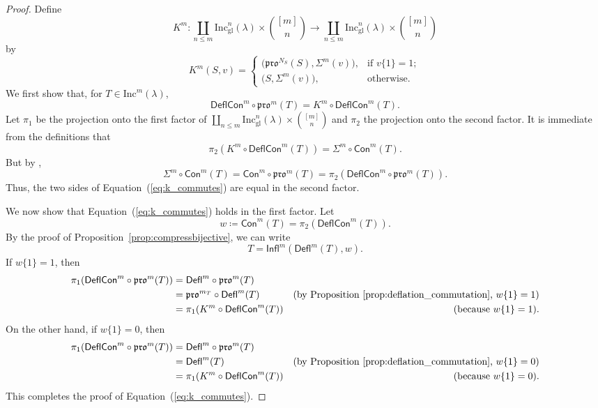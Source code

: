 \documentclass[12pt]{amsart}
\theoremstyle{definition}
\theoremstyle{remark}
\numberwithin{equation}{section}
\newcommand{\inc}{\ensuremath{\mathrm{Inc}}}
\newcommand{\incgl}{\inc_{\mathrm{gl}}}
\newcommand{\pro}{\mathfrak{pro}}
\newcommand{\deflate}{\ensuremath{\mathsf{Defl}}}
\newcommand{\tinflate}{\ensuremath{\mathsf{Infl}}}
\newcommand{\content}{\ensuremath{\mathsf{Con}}}
\newcommand{\compress}{\ensuremath{\mathsf{DeflCon}}}
\begin{document}
  \begin{proof}
Define
  \[
  K^m: \coprod_{n \leq m}\incgl^n(\lambda) \times \binom{[m]}{n} \rightarrow \coprod_{n \leq m}\incgl^n(\lambda) \times \binom{[m]}{n}
  \] by
\[
K^m(S,v) =
\begin{cases}
    \big( \pro^{N_S}(S),\Sigma^m(v) \big),  & \text{if } v\{1\} = 1; \\        
   \big( S,\Sigma^m(v) \big), & \text{otherwise.}
\end{cases}
\]
We first show that, for $T \in \inc^m(\lambda)$,
\begin{equation}\label{eq:k_commutes}
\compress^m \circ \pro^m(T) = K^m \circ \compress^m(T).
\end{equation}
Let $\pi_1$ be the projection onto the first factor of $\coprod_{n \leq m}\incgl^n(\lambda) \times \binom{[m]}{n}$ and $\pi_2$ the projection onto the second factor. It is immediate from the definitions that \[ \pi_2(K^m \circ \compress^m(T)) = \Sigma^m \circ \content^m(T).\] But by \cite[Lemma~2.1]{DPS},
\[  \Sigma^m \circ \content^m(T) = \content^m \circ \pro^m(T) = \pi_2(\compress^m \circ \pro^m(T)).\] Thus, the two sides of Equation~(\ref{eq:k_commutes}) are equal in the second factor.  

We now show that Equation~(\ref{eq:k_commutes}) holds in the first factor. Let \[ w \coloneqq \content^m(T) = \pi_2(\compress^m(T)). \]  By the proof of Proposition~\ref{prop:compressbijective}, we can write
\[ T = \tinflate^m(\deflate^m(T), w).\] 
If $w\lbrace 1 \rbrace = 1 $, then
\begin{align*}
\pi_1(\compress^m \circ \pro^m(T)) &= \deflate^m \circ \pro^m(T) \\
&= \pro^{m_T} \circ \deflate^m (T) &\text{(by Proposition~\ref{prop:deflation_commutation}, $w\lbrace 1 \rbrace = 1$)} \\
&= \pi_1(K^m \circ \compress^m(T)) &\text{(because $w\lbrace 1 \rbrace = 1$).}
\end{align*}
On the other hand, if $w \lbrace 1 \rbrace = 0$, then 
\begin{align*}
\pi_1(\compress^m \circ \pro^m(T)) &= \deflate^m \circ \pro^m(T) \\
&= \deflate^m(T) &\text{(by Proposition~\ref{prop:deflation_commutation}, $w \lbrace 1 \rbrace = 0$)} \\
&= \pi_1 ( K^m \circ \compress^m(T)) &\text{(because $w\lbrace 1 \rbrace = 0$).}
\end{align*}
This completes the proof of Equation~(\ref{eq:k_commutes}).


\end{proof}
\end{document}
